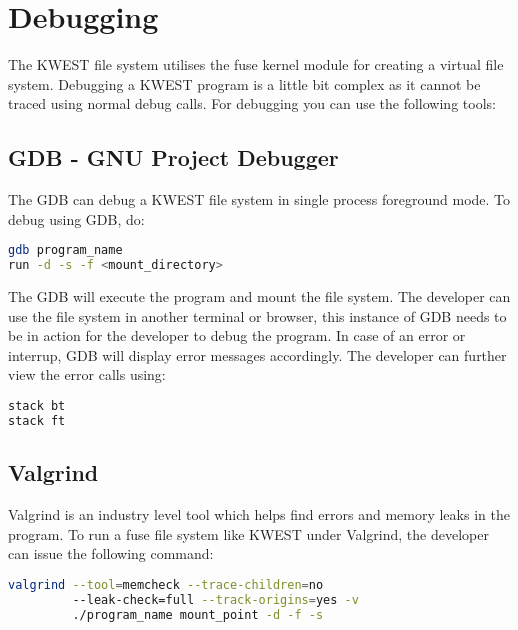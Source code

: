 \section{Debugging}
The KWEST file system utilises the fuse kernel module for creating a virtual file system. Debugging a KWEST program is a little bit complex as it cannot be traced using normal debug calls. For debugging you can use the following tools:
\subsection*{GDB - GNU Project Debugger}
The GDB can debug a KWEST file system in single process foreground mode. To debug using GDB, do:
\begin{lstlisting}[language=bash,frame=single]
gdb program_name
run -d -s -f <mount_directory>
\end{lstlisting}
The GDB will execute the program and mount the file system. The developer can use the file system in another terminal or browser, this instance of GDB needs to be in action for the developer to debug the program. In case of an error or interrup, GDB will display error messages accordingly. The developer can further view the error calls using:
\begin{lstlisting}[language=bash,frame=single]
stack bt
stack ft
\end{lstlisting}

\subsection*{Valgrind}
Valgrind is an industry level tool which helps find errors and memory leaks in the program. To run a fuse file system like KWEST under Valgrind, the developer can issue the following command:
\begin{lstlisting}[language=bash,frame=single]
valgrind --tool=memcheck --trace-children=no 
         --leak-check=full --track-origins=yes -v 
         ./program_name mount_point -d -f -s
\end{lstlisting}

